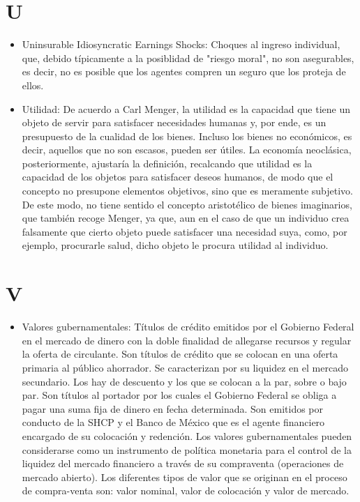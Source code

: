 \documentclass{article}
\begin{document}
\section{U}
\begin{itemize}

\item Uninsurable Idiosyncratic Earnings Shocks: Choques al ingreso individual, que, debido típicamente a la posiblidad de "riesgo moral", no son asegurables, es decir, no es posible que los agentes compren un seguro que los proteja de ellos.

\item Utilidad: De acuerdo a Carl Menger, la utilidad es la capacidad que tiene un objeto de servir para satisfacer necesidades humanas y, por ende, es un presupuesto de la cualidad de los bienes. Incluso los bienes no económicos, es decir, aquellos que no son escasos, pueden ser útiles. La economía neoclásica, posteriormente, ajustaría la definición, recalcando que utilidad es la capacidad de los objetos para satisfacer deseos humanos, de modo que el concepto no presupone elementos objetivos, sino que es meramente subjetivo. De este modo, no tiene sentido el concepto aristotélico de bienes imaginarios, que también recoge Menger, ya que, aun en el caso de que un individuo crea falsamente que cierto objeto puede satisfacer una necesidad suya, como, por ejemplo, procurarle salud, dicho objeto le procura utilidad al individuo.

\end{itemize}

\section{V}
\begin{itemize}

\item Valores gubernamentales: Títulos de crédito emitidos por el Gobierno Federal en el mercado de dinero con la doble finalidad de allegarse recursos y regular la oferta de circulante. Son títulos de crédito que se colocan en una oferta primaria al público ahorrador. Se caracterizan por su liquidez en el mercado secundario. Los hay de descuento y los que se colocan a la par, sobre o bajo par. Son títulos al portador por los cuales el Gobierno Federal se obliga a pagar una suma fija de dinero en fecha determinada. Son emitidos por conducto de la SHCP y el Banco de México que es el agente financiero encargado de su colocación y redención. Los valores gubernamentales pueden considerarse como un instrumento de política monetaria para el control de la liquidez del mercado financiero a través de su compraventa (operaciones de mercado abierto). Los diferentes tipos de valor que se originan en el proceso de compra-venta son: valor nominal, valor de colocación y valor de mercado.

\end{itemize}
\end{document}
